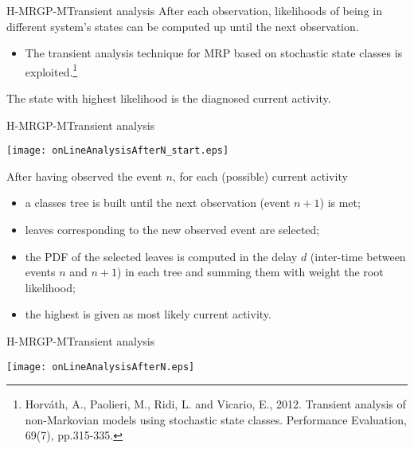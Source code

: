 \documentclass[9pt, handout]{beamer}
\begin{document}
      \begin{frame}{H-MRGP-M}{Transient analysis}
        \pause
        After each observation, likelihoods of being in different system's states can be computed up until the next observation.
        \pause
        \begin{itemize}
          \item The transient analysis technique for MRP based on stochastic state classes is exploited.\footnote{Horváth, A., Paolieri, M., Ridi, L. and Vicario, E., 2012. Transient analysis of non-Markovian models using stochastic state classes. Performance Evaluation, 69(7), pp.315-335.}
        \end{itemize}
        
        \pause
        
        \pause
        The state with highest likelihood is the diagnosed current activity.
      \end{frame}
      
      \begin{frame}{H-MRGP-M}{Transient analysis}
        \begin{center}
          \texttt{[image: onLineAnalysisAfterN\_start.eps]}
        \end{center}
        
        \pause
        After having observed the event $n$, for each (possible) current activity
        \pause
        \begin{itemize}
          \item a classes tree is built until the next observation (event $n+1$) is met;
          \pause
          \item leaves corresponding to the new observed event are selected;
          \pause
          \item the PDF of the selected leaves is computed in the delay $d$ (inter-time between events $n$ and $n+1$) in each tree and summing them with weight the root likelihood;
          \pause
          \item the highest is given as most likely current activity.
        \end{itemize}
      \end{frame}
      
      \begin{frame}{H-MRGP-M}{Transient analysis}
        \begin{center}
          \texttt{[image: onLineAnalysisAfterN.eps]}
        \end{center}
      \end{frame}
      
\end{document}
